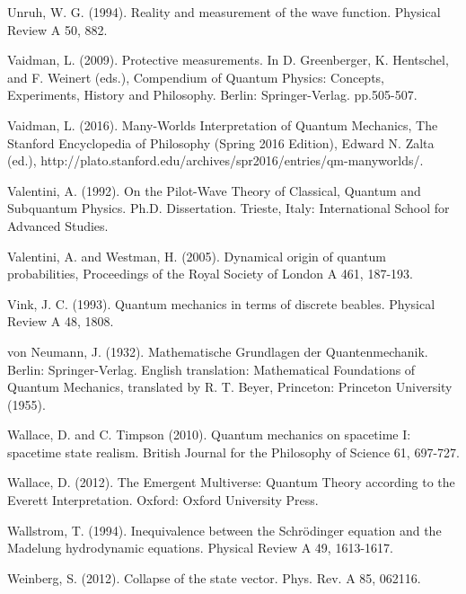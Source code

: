 \begin{thebibliography}{}
\bibitem{} Unruh, W. G. (1994). Reality and measurement of the wave function. Physical Review A 50, 882. 

\bibitem{} Vaidman, L. (2009). Protective measurements. In D. Greenberger, K. Hentschel, and F. Weinert (eds.), Compendium of Quantum Physics: Concepts, Experiments, History and Philosophy. Berlin: Springer-Verlag. pp.505-507.

\bibitem{} Vaidman, L. (2016). Many-Worlds Interpretation of Quantum Mechanics, The Stanford Encyclopedia of Philosophy (Spring 2016 Edition), Edward N. Zalta (ed.), http://plato.stanford.edu/archives/spr2016/entries/qm-manyworlds/.

\bibitem{} Valentini, A. (1992). On the Pilot-Wave Theory of Classical, Quantum and Subquantum Physics. Ph.D. Dissertation. Trieste, Italy: International School for Advanced Studies.



\bibitem{} Valentini, A. and Westman, H. (2005). Dynamical origin of quantum probabilities, Proceedings of the Royal Society of London A 461, 187-193.

\bibitem{} Vink, J. C. (1993). Quantum mechanics in terms of discrete beables. Physical Review A 48, 1808.

\bibitem{} von Neumann, J. (1932). Mathematische Grundlagen der Quantenmechanik. Berlin: Springer-Verlag. English translation: Mathematical Foundations of Quantum Mechanics, translated by R. T. Beyer,  Princeton: Princeton University (1955).

\bibitem{} Wallace, D.  and C. Timpson (2010). Quantum mechanics on spacetime I: spacetime state
realism. British Journal for the Philosophy of Science 61, 697-727.

\bibitem{} Wallace, D. (2012). The Emergent Multiverse: Quantum Theory according to the Everett Interpretation. Oxford: Oxford University Press.

\bibitem{} Wallstrom, T. (1994). Inequivalence between the Schr\"{o}dinger equation and the Madelung hydrodynamic equations. Physical Review A 49, 1613-1617.


\bibitem{} Weinberg, S. (2012). Collapse of the state vector. Phys. Rev. A 85, 062116.


\end{thebibliography}
